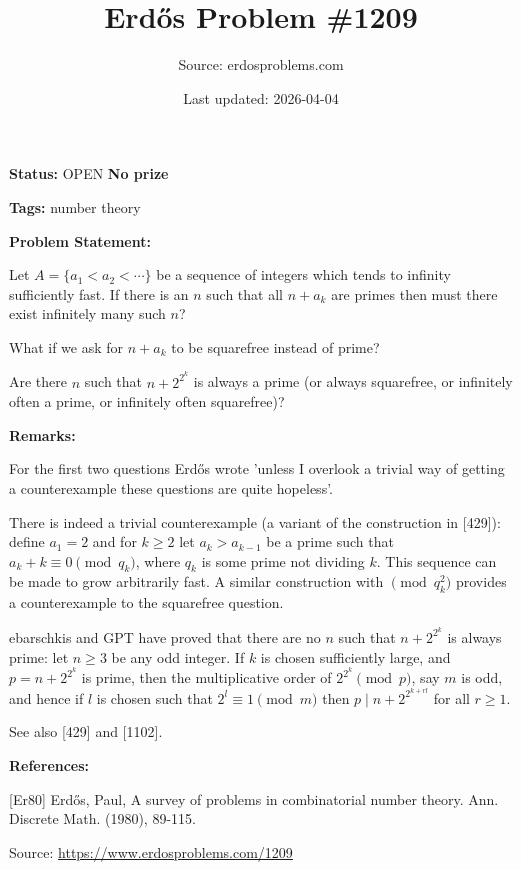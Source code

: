 \documentclass{article}
\title{Erd\H{o}s Problem \#1209}
\date{Last updated: 2026-04-04}
\author{Source: erdosproblems.com}
\begin{document}
\maketitle

\noindent\textbf{Status:} OPEN \quad \textbf{No prize}

\noindent\textbf{Tags:} number theory

\medskip
\noindent\textbf{Problem Statement:}

Let $A=\{a_1<a_2<\cdots\}$ be a sequence of integers which tends to infinity sufficiently fast. If there is an $n$ such that all $n+a_k$ are primes then must there exist infinitely many such $n$?

What if we ask for $n+a_k$ to be squarefree instead of prime?

Are there $n$ such that $n+2^{2^k}$ is always a prime (or always squarefree, or infinitely often a prime, or infinitely often squarefree)?

\bigskip
\noindent\textbf{Remarks:}

For the first two questions Erd\H{o}s \cite{Er80} wrote 'unless I overlook a trivial way of getting a counterexample these questions are quite hopeless'.

There is indeed a trivial counterexample (a variant of the construction in [429]): define $a_1=2$ and for $k\geq 2$ let $a_k>a_{k-1}$ be a prime such that $a_k+k\equiv 0\pmod{q_k}$, where $q_k$ is some prime not dividing $k$. This sequence can be made to grow arbitrarily fast. A similar construction with $\pmod{q_k^2}$ provides a counterexample to the squarefree question.

ebarschkis and GPT have proved that there are no $n$ such that $n+2^{2^k}$ is always prime: let $n\geq 3$ be any odd integer. If $k$ is chosen sufficiently large, and $p=n+2^{2^{k}}$ is prime, then the multiplicative order of $2^{2^k}\pmod{p}$, say $m$ is odd, and hence if $l$ is chosen such that $2^l\equiv 1\pmod{m}$ then $p\mid n+2^{2^{k+rl}}$ for all $r\geq 1$.

See also [429] and [1102].

\bigskip
\noindent\textbf{References:}

[Er80] Erd\H{o}s, Paul, A survey of problems in combinatorial number theory. Ann. Discrete Math. (1980), 89-115.

\bigskip
\noindent\small{Source: \url{https://www.erdosproblems.com/1209}}
\end{document}
